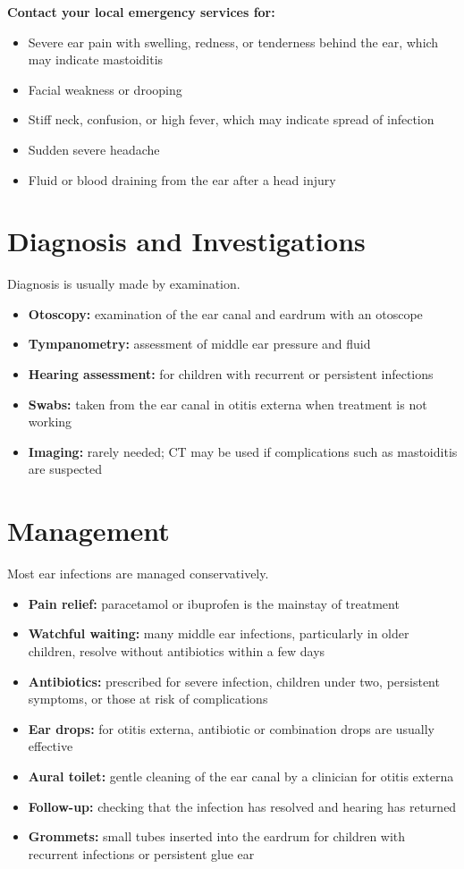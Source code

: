 \textbf{Contact your local emergency services for:}
\begin{itemize}
    \item Severe ear pain with swelling, redness, or tenderness behind the ear, which may indicate mastoiditis
    \item Facial weakness or drooping
    \item Stiff neck, confusion, or high fever, which may indicate spread of infection
    \item Sudden severe headache
    \item Fluid or blood draining from the ear after a head injury
\end{itemize}

\section*{Diagnosis and Investigations}
Diagnosis is usually made by examination.
\begin{itemize}
    \item \textbf{Otoscopy:} examination of the ear canal and eardrum with an otoscope
    \item \textbf{Tympanometry:} assessment of middle ear pressure and fluid
    \item \textbf{Hearing assessment:} for children with recurrent or persistent infections
    \item \textbf{Swabs:} taken from the ear canal in otitis externa when treatment is not working
    \item \textbf{Imaging:} rarely needed; CT may be used if complications such as mastoiditis are suspected
\end{itemize}

\section*{Management}
Most ear infections are managed conservatively.
\begin{itemize}
    \item \textbf{Pain relief:} paracetamol or ibuprofen is the mainstay of treatment
    \item \textbf{Watchful waiting:} many middle ear infections, particularly in older children, resolve without antibiotics within a few days
    \item \textbf{Antibiotics:} prescribed for severe infection, children under two, persistent symptoms, or those at risk of complications
    \item \textbf{Ear drops:} for otitis externa, antibiotic or combination drops are usually effective
    \item \textbf{Aural toilet:} gentle cleaning of the ear canal by a clinician for otitis externa
    \item \textbf{Follow-up:} checking that the infection has resolved and hearing has returned
    \item \textbf{Grommets:} small tubes inserted into the eardrum for children with recurrent infections or persistent glue ear
\end{itemize}

